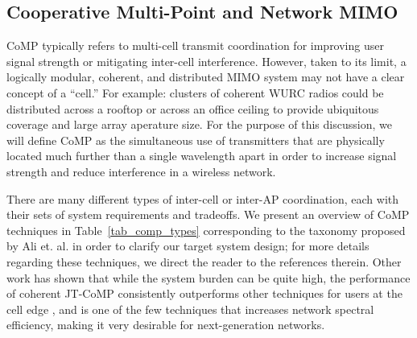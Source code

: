 


\subsection{Cooperative Multi-Point and Network \ac{MIMO}}
\label{sec_comp_brief}



	\ac{CoMP} typically refers to multi-cell transmit coordination \cite{ali2014evolution} for improving user signal strength or mitigating inter-cell interference.
	However, taken to its limit, a logically modular, coherent, and distributed \ac{MIMO} system may not have a clear concept of a ``cell.''
	For example: clusters of coherent \ac{WURC} radios could be distributed across a rooftop or across an office ceiling to provide ubiquitous coverage and large array aperature size.
	For the purpose of this discussion, we will define \ac{CoMP} as the simultaneous use of transmitters that are physically located much further than a single wavelength apart in order to increase signal strength and reduce interference in a wireless network.
		
	There are many different types of inter-cell or inter-\ac{AP} coordination, each with their sets of system requirements and tradeoffs.
	We present an overview of \ac{CoMP} techniques in Table~\ref{tab_comp_types} corresponding to the taxonomy proposed by Ali et. al. \cite{ali2014evolution} in order to clarify our target system design; for more details regarding these techniques, we direct the reader to the references therein.
	Other work has shown that while the system burden can be quite high, the performance of coherent \ac{JT}-\ac{CoMP} consistently outperforms other techniques for users at the cell edge \cite{cui2014evolution, kim2017call}, and is one of the few techniques that increases network spectral efficiency, making it very desirable for next-generation networks.
	
